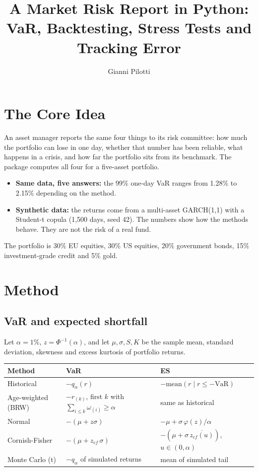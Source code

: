 \documentclass[11pt,a4paper]{article}
\title{A Market Risk Report in Python:\\VaR, Backtesting, Stress Tests and Tracking Error}
\author{Gianni Pilotti}
\date{}
\begin{document}
\maketitle

\section{The Core Idea}
An asset manager reports the same four things to its risk committee: how much the portfolio can lose in one day, whether that number has been reliable, what happens in a crisis, and how far the portfolio sits from its benchmark. The package computes all four for a five-asset portfolio.

\begin{itemize}
\item \textbf{Same data, five answers:} the 99\% one-day VaR ranges from 1.28\% to 2.15\% depending on the method.
\item \textbf{Synthetic data:} the returns come from a multi-asset GARCH(1,1) with a Student-t copula (1,500 days, seed 42). The numbers show how the methods behave. They are not the risk of a real fund.
\end{itemize}

The portfolio is 30\% EU equities, 30\% US equities, 20\% government bonds, 15\% investment-grade credit and 5\% gold.

\section{Method}
\subsection{VaR and expected shortfall}
Let $\alpha=1\%$, $z=\Phi^{-1}(\alpha)$, and let $\mu,\sigma,S,K$ be the sample mean, standard deviation, skewness and excess kurtosis of portfolio returns.

\begin{center}
\begin{tabular}{@{}lp{5.4cm}p{5.2cm}@{}}
\toprule
Method & VaR & ES \\
\midrule
Historical & $-q_\alpha(r)$ & $-\mathrm{mean}(r\mid r\le -\mathrm{VaR})$ \\[2pt]
Age-weighted (BRW) & $-r_{(k)}$, first $k$ with $\sum_{i\le k}\omega_{(i)}\ge\alpha$ & same as historical \\[2pt]
Normal & $-(\mu+z\sigma)$ & $-\mu+\sigma\,\varphi(z)/\alpha$ \\[2pt]
Cornish-Fisher & $-(\mu+z_{cf}\,\sigma)$ & $-(\mu+\sigma\,\overline{z_{cf}(u)})$, $u\in(0,\alpha)$ \\[2pt]
Monte Carlo (t) & $-q_\alpha$ of simulated returns & mean of simulated tail \\
\bottomrule
\end{tabular}
\end{center}
\end{document}

